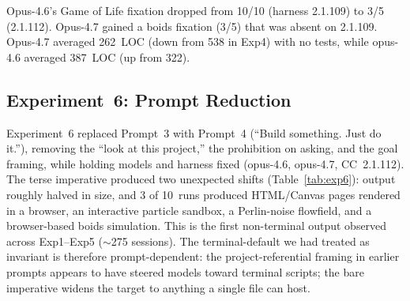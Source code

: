 \documentclass{article}
\begin{document}
\begin{table}[t]
\caption{Experiment~5: harness 2.1.112 (same prompt as Exp3--4).}
\label{tab:exp5}
\small{}
\end{table}

Opus-4.6's Game of Life fixation dropped from 10/10 (harness
2.1.109) to 3/5 (2.1.112). Opus-4.7 gained a boids fixation
(3/5) that was absent on 2.1.109. Opus-4.7 averaged 262~LOC
(down from 538 in Exp4) with no tests, while opus-4.6 averaged
387~LOC (up from 322).

\subsection{Experiment~6: Prompt Reduction}

Experiment~6 replaced Prompt~3 with Prompt~4 (``Build something.
Just do it.''), removing the ``look at this project,'' the
prohibition on asking, and the goal framing, while holding models
and harness fixed (opus-4.6, opus-4.7, CC~2.1.112). The terse
imperative produced two unexpected shifts (Table~\ref{tab:exp6}):
output roughly halved in size, and 3 of 10~runs produced
HTML/Canvas pages rendered in a browser, an interactive particle
sandbox, a Perlin-noise flowfield, and a browser-based boids
simulation. This is the first non-terminal output observed across
Exp1--Exp5 ($\sim$275 sessions). The terminal-default we had
treated as invariant is therefore prompt-dependent: the
project-referential framing in earlier prompts appears to have
steered models toward terminal scripts; the bare imperative
widens the target to anything a single file can host.
\end{document}
